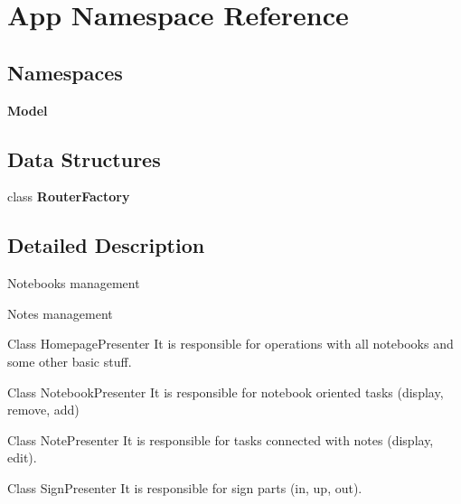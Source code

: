 \section{App Namespace Reference}
\label{namespace_app}
\subsection*{Namespaces}
\begin{DoxyCompactItemize}
\item 
 \textbf{ Model}
\end{DoxyCompactItemize}
\subsection*{Data Structures}
\begin{DoxyCompactItemize}
\item 
class \textbf{ Router\+Factory}
\end{DoxyCompactItemize}


\subsection{Detailed Description}
Notebooks management

Notes management

Class Homepage\+Presenter It is responsible for operations with all notebooks and some other basic stuff.

Class Notebook\+Presenter It is responsible for notebook oriented tasks (display, remove, add)

Class Note\+Presenter It is responsible for tasks connected with notes (display, edit).

Class Sign\+Presenter It is responsible for sign parts (in, up, out).